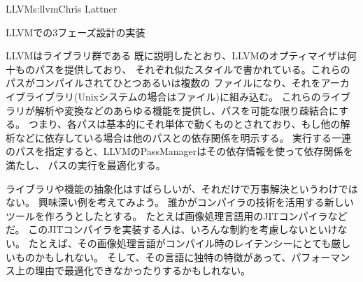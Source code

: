 \begin{aosachapter}{LLVM}{s:llvm}{Chris Lattner}
\begin{aosasect1}{LLVMでの3フェーズ設計の実装}
\begin{aosasect2}{LLVMはライブラリ群である}
既に説明したとおり、LLVMのオプティマイザは何十ものパスを提供しており、
それぞれ似たスタイルで書かれている。これらのパスがコンパイルされてひとつあるいは複数の
ファイルになり、それをアーカイブライブラリ(Unixシステムの場合はファイル)に組み込む。
これらのライブラリが解析や変換などのあらゆる機能を提供し、パスを可能な限り疎結合にする。
つまり、各パスは基本的にそれ単体で動くものとされており、もし他の解析などに依存している場合は他のパスとの依存関係を明示する。
実行する一連のパスを指定すると、LLVMのPassManagerはその依存情報を使って依存関係を満たし、
パスの実行を最適化する。

ライブラリや機能の抽象化はすばらしいが、それだけで万事解決というわけではない。
興味深い例を考えてみよう。
誰かがコンパイラの技術を活用する新しいツールを作ろうとしたとする。
たとえば画像処理言語用のJITコンパイラなどだ。
このJITコンパイラを実装する人は、いろんな制約を考慮しないといけない。
たとえば、その画像処理言語がコンパイル時のレイテンシーにとても厳しいものかもしれない。
そして、その言語に独特の特徴があって、パフォーマンス上の理由で最適化できなかったりするかもしれない。


\end{aosasect2}
\end{aosasect1}
\end{aosachapter}
